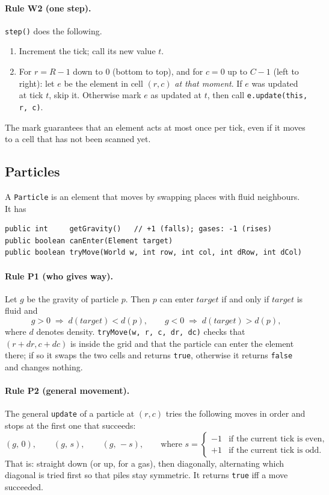 \documentclass[11pt,a4paper]{article}
\newcommand{\code}[1]{\texttt{#1}}
\begin{document}
\paragraph{Rule W2 (one step).} \code{step()} does the following.
\begin{enumerate}[nosep]
  \item Increment the tick; call its new value \(t\).
  \item For \(r = R-1\) down to \(0\) (bottom to top), and for \(c = 0\) up to \(C-1\) (left to
        right): let \(e\) be the element in cell \((r,c)\) \emph{at that moment}. If
        \(e\) was updated at tick \(t\), skip it. Otherwise mark \(e\) as updated at \(t\), then
        call \code{e.update(this, r, c)}.
\end{enumerate}
The mark guarantees that an element acts at most once per tick, even if it moves to a cell
that has not been scanned yet.

\subsection{Particles}\label{sec:particles}

A \code{Particle} is an element that moves by swapping places with fluid neighbours. It has
\begin{lstlisting}
public int     getGravity()   // +1 (falls); gases: -1 (rises)
public boolean canEnter(Element target)
public boolean tryMove(World w, int row, int col, int dRow, int dCol)
\end{lstlisting}

\paragraph{Rule P1 (who gives way).} Let \(g\) be the gravity of particle \(p\). Then
\(p\) can enter \(\mathit{target}\) if and only if \(\mathit{target}\) is fluid and
\[
  g > 0 \;\Rightarrow\; d(\mathit{target}) < d(p),
  \qquad
  g < 0 \;\Rightarrow\; d(\mathit{target}) > d(p),
\]
where \(d\) denotes density. \code{tryMove(w, r, c, dr, dc)} checks that \((r+dr, c+dc)\) is inside
the grid and that the particle can enter the element there; if so it swaps the two cells and
returns \code{true}, otherwise it returns \code{false} and changes nothing.

\paragraph{Rule P2 (general movement).} The general \code{update} of a particle at \((r,c)\) tries
the following moves in order and stops at the first one that succeeds:
\[
  (g,\,0), \qquad (g,\,s), \qquad (g,\,-s),
  \qquad\text{where } s = \begin{cases} -1 & \text{if the current tick is even},\\
                                         +1 & \text{if the current tick is odd.}\end{cases}
\]
That is: straight down (or up, for a gas), then diagonally, alternating which diagonal is tried
first so that piles stay symmetric. It returns \code{true} iff a move succeeded.
\end{document}
